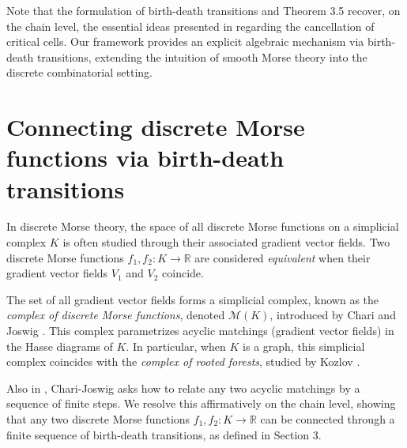 \documentclass[a4paper,12pt,notitlepage]{amsart}
\theoremstyle{definition}%
\theoremstyle{definition}%
\theoremstyle{definition}%
\newcommand{\M}{\mathcal{M}}
\newcommand{\R}{\mathbb{R}}
\begin{document}
Note that the formulation of birth-death transitions and Theorem 3.5
recover, on the chain level, 
the essential ideas presented
in \cite[Section 11]{Morse Theory for Cell Complexes}
regarding the cancellation 
of critical cells.
Our framework provides an explicit 
algebraic mechanism via birth-death transitions,
extending 
the intuition  of smooth Morse theory \cite{laudenbach} into the discrete combinatorial 
setting.
\section{Connecting discrete Morse functions via birth-death transitions}

In discrete Morse theory, the space of all discrete Morse functions on a simplicial complex $K$ is often studied through  their associated gradient vector fields.
Two discrete Morse functions $f_1, f_2: K \to \mathbb{R}$ are 
considered \emph{equivalent} when their gradient vector fields $V_1$ and $V_2$ coincide. 


The set of all
gradient vector fields forms a simplicial complex, known as the \textit{complex of discrete Morse functions},  denoted $\M(K)$,  introduced by Chari and Joswig \cite{chari}. 
This complex parametrizes acyclic matchings (gradient vector fields) 
in the Hasse diagrams of $K$.
In particular, when 
$K$
 is a graph, this simplicial complex coincides with the \textit{complex of rooted forests},  studied by Kozlov \cite{Kozlov}.

Also in \cite{chari},  Chari-Joswig asks how to relate any two 
acyclic matchings by a sequence of finite steps.
We resolve this affirmatively on the chain level, showing that any two discrete Morse functions 
$f_1, f_2:K \to \R$
can be connected through a finite sequence of birth-death transitions, as defined in Section 3.
\end{document}
